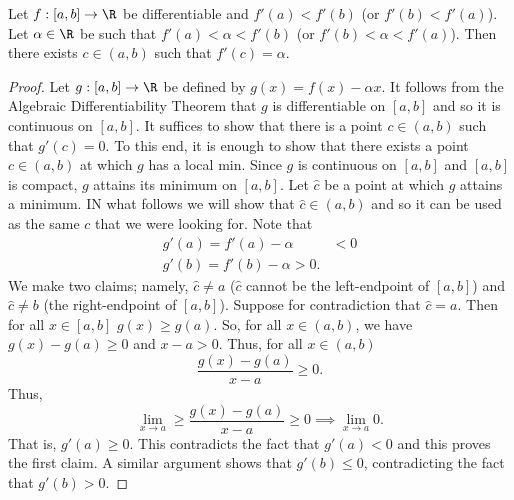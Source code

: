 \begin{theorem}\label{Darboux's Theorem}
    Let \( f: [a,b] \to \R  \) be differentiable and \( f'(a) < f'(b) \) (or \( f'(b) < f'(a) \)). Let \( \alpha \in \R  \) be such that \( f'(a) < \alpha < f'(b)  \) (or \( f'(b) < \alpha < f'(a) \)). Then there exists \( c \in (a,b) \) such that \( f'(c) = \alpha \).
\end{theorem}
\begin{proof}
    Let \( g:[a,b] \to \R  \) be defined by \( g(x) = f(x) - \alpha x  \). It follows from the Algebraic Differentiability Theorem that \( g  \) is differentiable on \( [a,b] \) and so it is continuous on \( [a,b] \). It suffices to show that there is a point \( c \in (a,b) \) such that \( g'(c) = 0 \). To this end, it is enough to show that there exists a point \( c \in (a,b) \) at which \( g  \) has a local min. Since \( g  \) is continuous on \( [a,b] \) and \( [a,b]  \) is compact, \( g  \) attains its minimum on \( [a,b] \). Let \( \hat{c} \) be a point at which \( g  \) attains a minimum. IN what follows we will show that \( \hat{c} \in (a,b) \) and so it can be used as the same \( c  \) that we were looking for. Note that  
    \begin{align*}
        g'(a) = f'(a) - \alpha &<  0 \\
        g'(b) = f'(b) - \alpha > 0. 
    \end{align*}
    We make two claims; namely, \( \hat{c} \neq a  \) (\( \hat{c}  \) cannot be the left-endpoint of \( [a,b] \)) and \( \hat{c} \neq b  \) (the right-endpoint of \( [a,b] \)). Suppose for contradiction that \( \hat{c}= a  \). Then for all \( x \in [a,b] \) \( g(x) \geq g(a) \). So, for all \( x \in (a,b) \), we have \( g(x) - g(a) \geq 0  \) and \( x - a > 0  \). Thus, for all \( x \in (a,b) \)
    \[  \frac{ g(x) - g(a) }{ x - a  }  \geq 0.  \]
    Thus, 
    \[  \lim_{ x \to a }  \geq \frac{ g(x) - g(a) }{  x - a  }  \geq 0 \implies \lim_{ x \to a  }  0.   \]
    That is, \( g'(a) \geq 0  \). This contradicts the fact that \( g'(a) < 0 \) and this proves the first claim.
    A similar argument shows that \( g'(b) \leq 0  \), contradicting the fact that \( g'(b) > 0  \).
\end{proof}






